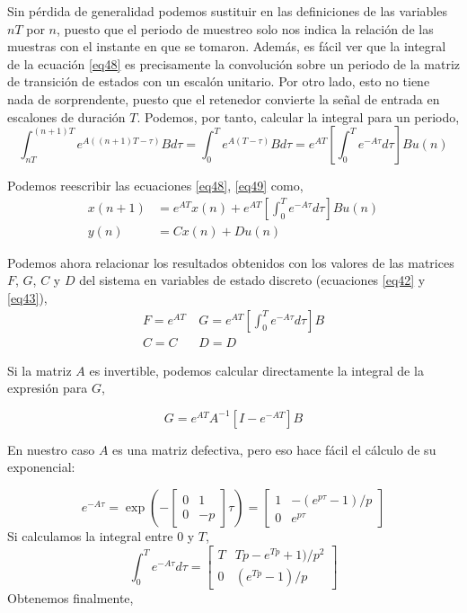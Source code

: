 \documentclass[10pt,a4paper]{report}
\begin{document}
Sin pérdida de generalidad podemos sustituir en las definiciones de las variables $nT$ por $n$, puesto que el periodo de muestreo solo nos indica la relación de las muestras con el instante en que se tomaron. Además, es fácil ver que la integral de la ecuación \ref{eq48} es precisamente la convolución sobre un periodo de la matriz de transición de estados con un escalón unitario. Por otro lado, esto no tiene nada de sorprendente, puesto que el retenedor convierte la señal de entrada en escalones de duración $T$. Podemos, por tanto, calcular la integral para un periodo,
\begin{equation}
\int_{nT}^{(n+1)T} e^{A((n+1)T-\tau)}Bd\tau = \int_0^Te^{A(T-\tau)}Bd\tau = e^{AT}\left[\int_0^Te^{-A\tau}d\tau \right]Bu(n)
\end{equation}

Podemos reescribir las ecuaciones \ref{eq48}, \ref{eq49} como,
\begin{align}
x(n+1) &= e^{AT}x(n) + e^{AT}\left[\int_0^Te^{-A\tau}d\tau \right]Bu(n) \label{eq532}\\
y(n) &= Cx(n) + Du(n) \label{eq533}
\end{align}

Podemos  ahora relacionar los resultados obtenidos con los valores de las matrices $F$, $G$, $C$ y $D$ del sistema en variables de estado discreto (ecuaciones \ref{eq42} y \ref{eq43}), 
\begin{align}
F = e^{AT} & \ G = e^{AT}\left[\int_0^Te^{-A\tau}d\tau \right]B\\
C = C\ \ \  & \ D=D
\end{align}

Si la matriz $A$ es invertible, podemos calcular directamente la integral de la expresión para $G$,

\begin{equation*}
	G = e^{AT}A^{-1}\left[I-e^{-AT}\right]B
\end{equation*}

En nuestro caso $A$ es una matriz defectiva, pero eso hace fácil el cálculo de su exponencial:

\begin{equation*}
	e^{-A\tau}=\exp\left(-\begin{bmatrix}
		0 & 1\\
		0 &-p
	\end{bmatrix}\tau\right) = \begin{bmatrix}
	1 & -(e^{p\tau}-1)/p\\
	0& e^{p\tau}
\end{bmatrix}
\end{equation*}
Si calculamos la integral entre $0$ y $T$,
\begin{equation*}
	\int_0^Te^{-A\tau}d\tau = 
	\begin{bmatrix}
		T & Tp-e^{Tp}+1)/p^2\\
		0 &(e^{Tp}-1)/p
	\end{bmatrix}
\end{equation*}
Obtenemos finalmente,
\end{document}
